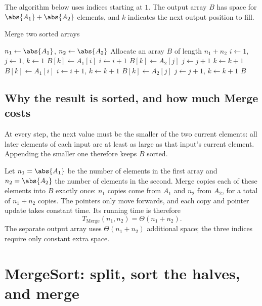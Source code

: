 \documentclass[a4paper,12pt,oneside]{report}
\begin{document}
The algorithm below uses indices starting at $1$. The output array
$B$ has space for $\abs{A_1}+\abs{A_2}$ elements, and $k$ indicates
the next output position to fill.

\begin{framedalgo}{Merge two sorted arrays}\label{alg:merge}
\begin{algorithmic}[1]
    \State $n_1\gets\abs{A_1}$, $n_2\gets\abs{A_2}$
    \State Allocate an array $B$ of length $n_1+n_2$
    \State $i\gets1$, $j\gets1$, $k\gets1$
        \State $B[k]\gets A_1[i]$
        \State $i\gets i+1$
      \Else
        \State $B[k]\gets A_2[j]$
        \State $j\gets j+1$
      \EndIf
      \State $k\gets k+1$
    \EndWhile
      \State $B[k]\gets A_1[i]$
      \State $i\gets i+1$, $k\gets k+1$
    \EndWhile
      \State $B[k]\gets A_2[j]$
      \State $j\gets j+1$, $k\gets k+1$
    \EndWhile
    \State \Return $B$
  \EndFunction
\end{algorithmic}
\end{framedalgo}

\subsection{Why the result is sorted, and how much Merge costs}

At every step, the next value must be the smaller of the two current
elements: all later elements of each input are at least as large as
that input's current element. Appending the smaller one therefore
keeps $B$ sorted.

Let $n_1=\abs{A_1}$ be the number of elements in the first array and
$n_2=\abs{A_2}$ the number of elements in the second. Merge copies
each of these elements into $B$ exactly once: $n_1$ copies come from
$A_1$ and $n_2$ from $A_2$, for a total of $n_1+n_2$ copies.
The pointers only move forwards, and each copy and pointer update
takes constant time. Its running time is therefore
\[
  \boxed{T_{\mathrm{Merge}}(n_1,n_2)=\Theta(n_1+n_2).}
\]
The separate output array uses $\Theta(n_1+n_2)$ additional space;
the three indices require only constant extra space.

\section{MergeSort: split, sort the halves, and merge}
\end{document}

